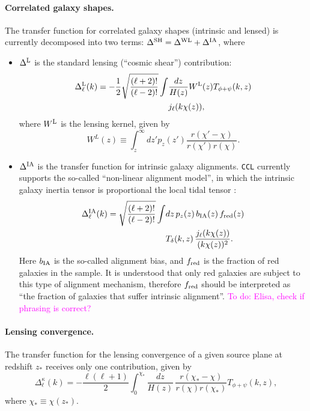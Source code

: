 \documentclass[\docopts]{\docclass}
\newcommand{\todo}[1]{\textcolor{magenta}{To do: #1}}
\newcommand{\ccl}{{\tt CCL}\xspace}
\begin{document}
\paragraph{\bf Correlated galaxy shapes.} The transfer function for correlated galaxy shapes (intrinsic and lensed) is currently decomposed into two terms: $\Delta^{\rm SH}=\Delta^{\rm WL}+\Delta^{\rm IA}$, where
\begin{itemize}
  \item $\Delta^{\rm L}$ is the standard lensing (``cosmic shear'') contribution:
    \begin{align} \label{eq:transfer_lensing}
      \nonumber
      \Delta_\ell^{\rm L}(k)=-\frac{1}{2}\sqrt{\frac{(\ell+2)!}{(\ell-2)!}}\int &\frac{dz}{H(z)} W^{\rm L}(z)T_{\phi+\psi}(k,z)\\
      &j_\ell(k\chi(z)),
    \end{align}
    where $W^{\rm L}$ is the lensing kernel, given by
    \begin{equation}
      W^L(z)\equiv\int_z^\infty dz' p_z(z')\frac{r(\chi'-\chi)}{r(\chi')r(\chi)}.
    \end{equation}
  \item $\Delta^{\rm IA}$ is the transfer function for intrinsic galaxy alignments. \ccl currently supports the so-called ``non-linear alignment model'', in which the intrinsic galaxy inertia tensor is proportional the local tidal tensor \cite{2004PhRvD..70f3526H,2007MNRAS.381.1197H}:
    \begin{align}\nonumber
      \Delta_\ell^{\rm IA}(k)=\sqrt{\frac{(\ell+2)!}{(\ell-2)!}}\int &dz\,p_z(z)\,b_{\rm IA}(z)\,f_{\rm red}(z)\\
      &T_\delta(k,z)\,\frac{j_\ell(k\chi(z))}{(k\chi(z))^2}.
    \end{align}
    Here $b_{\rm IA}$ is the so-called alignment bias, and $f_{\rm red}$ is the fraction of red galaxies in the sample. It is understood that only red galaxies are subject to this type of alignment mechanism, therefore $f_{\rm red}$ should be interpreted as ``the fraction of galaxies that suffer intrinsic alignment''. \todo{Elisa, check if phrasing is correct?}
\end{itemize}

\paragraph{\bf Lensing convergence.} The transfer function for the lensing convergence of a given source plane at redshift $z_*$ receives only one contribution, given by
\begin{equation}
  \Delta_\ell^\kappa(k)=-\frac{\ell(\ell+1)}{2}\int_0^{\chi_*}\frac{dz}{H(z)}\,\frac{r(\chi_*-\chi)}{r(\chi)r(\chi_*)}T_{\phi+\psi}(k,z),
\end{equation}
where $\chi_*\equiv\chi(z_*)$.
\end{document}
